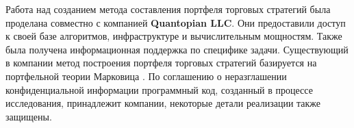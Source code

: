 Работа над созданием метода составления портфеля торговых стратегий была проделана совместно с компанией \textbf{Quantopian LLC}. Они предоставили доступ к своей базе алгоритмов, инфраструктуре и вычислительным мощностям. Также была получена информационная поддержка по специфике задачи. Существующий в компании метод построения портфеля торговых стратегий базируется на портфельной теории Марковица \citep{markovitz1959}. По соглашению о неразглашении конфиденциальной информации программный код, созданный в процессе исследования, принадлежит компании, некоторые детали реализации также защищены.  
